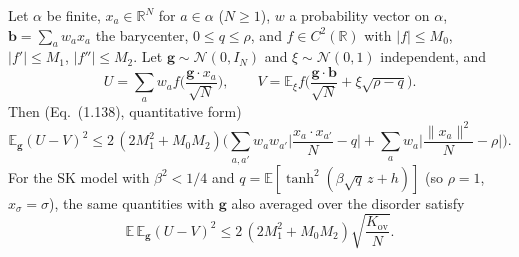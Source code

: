 \begin{theorem}\label{thm:sg-tal:random-projection}
  \leanok
{}
Let $\alpha$ be finite, $x_a\in\mathbb R^N$ for $a\in\alpha$ ($N\ge1$), $w$ a probability vector on $\alpha$, $\mathbf b=\sum_aw_ax_a$ the barycenter, $0\le q\le\rho$, and $f\in C^2(\mathbb R)$ with $|f|\le M_0$, $|f'|\le M_1$, $|f''|\le M_2$. Let $\mathbf g\sim\mathcal N(0,I_N)$ and $\xi\sim\mathcal N(0,1)$ independent, and
\[
U=\sum_aw_af\Big(\frac{\mathbf g\cdot x_a}{\sqrt N}\Big),\qquad V=\mathbb{E}_\xi f\Big(\frac{\mathbf g\cdot\mathbf b}{\sqrt N}+\xi\sqrt{\rho-q}\Big).
\]
Then (Eq.~(1.138), quantitative form)
\[
\mathbb{E}_{\mathbf g}(U-V)^2\le2\,(2M_1^2+M_0M_2)\Big(\sum_{a,a'}w_aw_{a'}\Big|\frac{x_a\cdot x_{a'}}N-q\Big|+\sum_aw_a\Big|\frac{\|x_a\|^2}N-\rho\Big|\Big).
\]
For the SK model with $\beta^2<1/4$ and $q=\mathbb{E}[\tanh^2(\beta\sqrt q\,z+h)]$ (so $\rho=1$, $x_\sigma=\sigma$), the same quantities with $\mathbf g$ also averaged over the disorder satisfy
\[
\mathbb{E}\,\mathbb{E}_{\mathbf g}(U-V)^2\le2\,(2M_1^2+M_0M_2)\sqrt{\frac{K_{\mathrm{ov}}}N}.
\]
\end{theorem}

